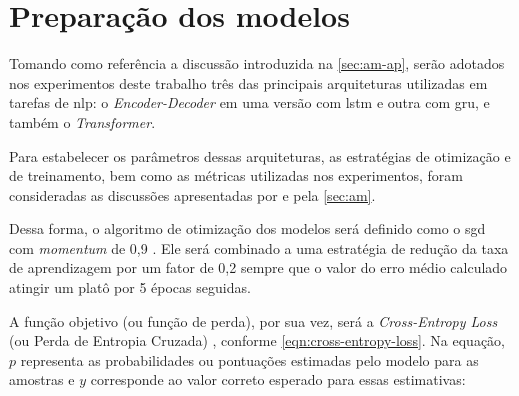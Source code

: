 \section{Preparação dos modelos}
\label{sec:metodos-preparacao-modelos}






Tomando como referência a discussão introduzida na \autoref{sec:am-ap}, serão adotados nos experimentos deste trabalho três das principais arquiteturas utilizadas em tarefas de \acrfull{nlp}: o \textit{Encoder-Decoder} em uma versão com \acrfull{lstm} e outra com \acrfull{gru}, e também o \textit{Transformer}.


Para estabelecer os parâmetros dessas arquiteturas, as estratégias de otimização e de treinamento, bem como as métricas utilizadas nos experimentos, foram consideradas as discussões apresentadas por  e pela \autoref{sec:am}.

Dessa forma, o algoritmo de otimização dos modelos será definido como o \acrfull{sgd} com \textit{momentum} de 0,9 \cite{bengio-2013-optimizing-rnns}. Ele será combinado a uma estratégia de redução da taxa de aprendizagem por um fator de 0,2 sempre que o valor do erro médio calculado atingir um platô por 5 épocas seguidas.

A função objetivo (ou função de perda), por sua vez, será a \textit{Cross-Entropy Loss} (ou Perda de Entropia Cruzada) \cite{mitchell-1997-ml}, conforme \autoref{eqn:cross-entropy-loss}. Na equação, \(p\) representa as probabilidades ou pontuações estimadas pelo modelo para as amostras e \(y\) corresponde ao valor correto esperado para essas estimativas:

